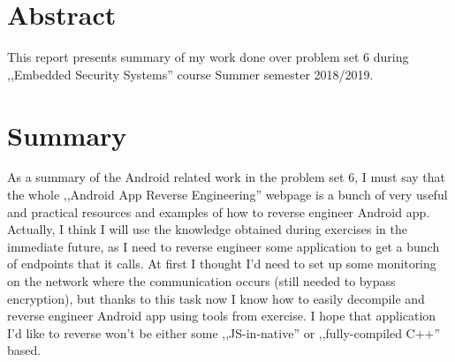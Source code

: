 \documentclass[12pt]{article}
\begin{document}


\section{Abstract}

This report presents summary of my work done over problem set 6
during ,,Embedded Security Systems'' course Summer semester 2018/2019.



\section{Summary}
As a summary of the Android related work in the problem set 6, I must say that the whole ,,Android App Reverse Engineering'' webpage is a bunch of very useful and practical resources and examples of how to reverse engineer Android app. Actually, I think I will use the knowledge obtained during exercises in the immediate future, as I need to reverse engineer some application to get a bunch of endpoints that it calls. At first I thought I'd need to set up some monitoring on the network where the communication occurs (still needed to bypass encryption), but thanks to this task now I know how to easily decompile and reverse engineer Android app using tools from exercise. I hope that application I'd like to reverse won't be either some ,,JS-in-native'' or ,,fully-compiled C++'' based.
\end{document}
